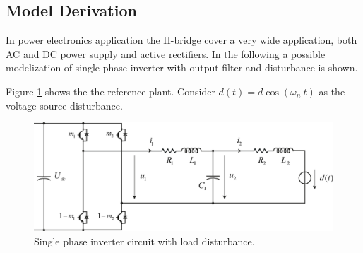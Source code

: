 \documentclass[11pt,a4paper,oneside]{book}
\numberwithin{equation}{section}
\theoremstyle{it}
\theoremstyle{definition}
\begin{document}
\subsection{Model Derivation}
In power electronics application the H-bridge cover a very wide application, 
both AC and DC power supply and active rectifiers. In the following a possible 
modelization of single phase inverter with output filter and disturbance is 
shown.

Figure \ref{figure_singlephaseinv} shows the the reference plant. Consider 
$d(t) = d\cos(\omega_n \ t)$ as the voltage source disturbance.
\begin{figure}[H]
	\centering
	\includegraphics[width = 400pt, 
	keepaspectratio]{figures/single_phase_inverter/single_phase_inverter.eps}
	\captionsetup{width=0.5\textwidth, font=small}		
	\caption{Single phase inverter circuit with load disturbance.}
	\label{figure_singlephaseinv}
\end{figure}
\end{document}
